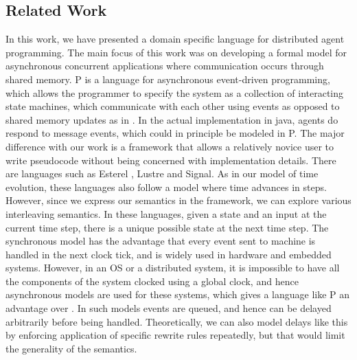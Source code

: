 \subsection{Related Work}
\label{sect:rel}
In this work, we have presented a domain specific language for distributed agent programming. The main focus of this work was on developing a formal model for asynchronous concurrent applications where communication occurs through shared memory. P  is a language for asynchronous event-driven programming, which allows the programmer to specify the system as a collection of interacting state machines, which communicate with each other using events as opposed to shared memory updates as in \rolang. In the actual implementation in java, agents do respond to message events, which could in principle be modeled in P. The major difference with our work is a framework that allows a relatively novice user to write pseudocode without being concerned with implementation details.
There are languages such as Esterel  , Lustre  and Signal. As in our model of time evolution, these languages also follow a model where time
advances in steps. However, since we express our semantics in the \K framework, we can explore various interleaving semantics. In these languages, given
a state and an input at the current time step, there is a unique possible
state at the next time step. 
The synchronous model has the advantage that every event
sent to machine is handled in the next clock tick, and is widely
used in hardware and embedded systems. However, in an OS or a
distributed system, it is impossible to have all the components of
the system clocked using a global clock, and hence asynchronous
models are used for these systems, which gives a language like P an advantage over \rolang. In such models events are
queued, and hence can be delayed arbitrarily before being handled. Theoretically, we can also model delays like this by enforcing application of specific rewrite rules repeatedly, but that would limit the generality of the semantics. 
